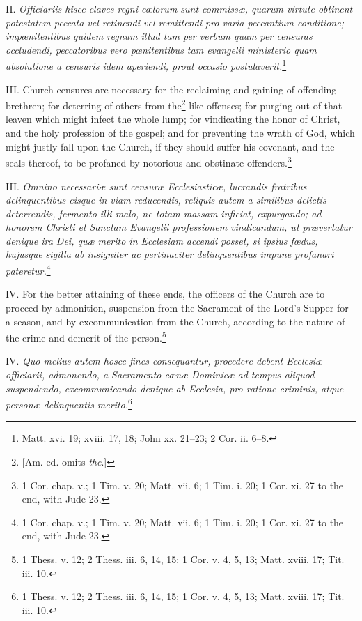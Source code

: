 II. \emph{Officiariis hisce claves regni cœlorum sunt commissæ, quarum virtute obtinent potestatem peccata vel retinendi vel remittendi pro varia peccantium conditione; impœnitentibus quidem regnum illud tam per verbum quam per censuras occludendi, peccatoribus vero pœnitentibus tam evangelii ministerio quam absolutione a censuris idem aperiendi, prout occasio postulaverit.}\footnote{Matt. xvi. 19; xviii. 17, 18; John xx. 21–23; 2 Cor. ii. 6–8.}

III. Church censures are necessary for the reclaiming and gaining of offending brethren; for deterring of others from the\footnote{[Am. ed. omits \emph{the}.]} like offenses; for purging out of that leaven which might infect the whole lump; for vindicating the honor of Christ, and the holy profession of the gospel; and for preventing the wrath of God, which might justly fall upon the Church, if they should suffer his covenant, and the seals thereof, to be profaned by notorious and obstinate offenders.\footnote{1 Cor. chap. v.; 1 Tim. v. 20; Matt. vii. 6; 1 Tim. i. 20; 1 Cor. xi. 27 to the end, with Jude 23.}

III. \emph{Omnino necessariæ sunt censuræ Ecclesiasticæ, lucrandis fratribus delinquentibus eisque in viam reducendis, reliquis autem a similibus delictis deterrendis, fermento illi malo, ne totam massam inficiat, expurgando; ad honorem Christi et Sanctam Evangelii professionem vindicandum, ut prævertatur denique ira Dei, quæ merito in Ecclesiam accendi posset, si ipsius fœdus, hujusque sigilla ab insigniter ac pertinaciter delinquentibus impune profanari pateretur.}\footnote{1 Cor. chap. v.; 1 Tim. v. 20; Matt. vii. 6; 1 Tim. i. 20; 1 Cor. xi. 27 to the end, with Jude 23.}

IV. For the better attaining of these ends, the officers of the Church are to proceed by admonition, suspension from the Sacrament of the Lord's Supper for a season, and by excommunication from the Church, according to the nature of the crime and demerit of the person.\footnote{1 Thess. v. 12; 2 Thess. iii. 6, 14, 15; 1 Cor. v. 4, 5, 13; Matt. xviii. 17; Tit. iii. 10.}

IV. \emph{Quo melius autem hosce fines consequantur, procedere debent Ecclesiæ officiarii, admonendo, a Sacramento cœnæ Dominicæ ad tempus aliquod suspendendo, excommunicando denique ab Ecclesia, pro ratione criminis, atque personæ delinquentis merito.}\footnote{1 Thess. v. 12; 2 Thess. iii. 6, 14, 15; 1 Cor. v. 4, 5, 13; Matt. xviii. 17; Tit. iii. 10.}


